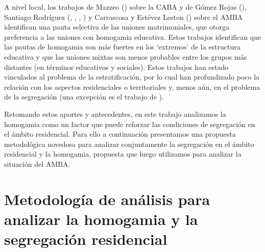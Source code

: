 \documentclass[
  spanish,
  a4paper,%
  chapterprefix=true,%
  DIV=calc,%
  twoside]{scrbook}%
\begin{document}
A nivel local, los trabajos de Mazzeo () sobre la CABA y de
Gómez Rojas (), Santiago Rodríguez (, , , ) y Carrascosa y Estévez Leston () sobre el AMBA
identifican una pauta selectiva de las uniones matrimoniales, que otorga
preferencia a las uniones con homogamia educativa. Estos trabajos
identifican que las pautas de homogamia son más fuertes en los
`extremos' de la estructura educativa y que las uniones mixtas son menos
probables entre los grupos más distantes (en términos educativos y
sociales). Estos trabajos han estado vinculados al problema de la
estratificación, por lo cual han profundizado poco la relación con los
aspectos residenciales o territoriales y, menos aún, en el problema de
la segregación (una excepción es el trabajo de ).

Retomando estos aportes y antecedentes, en este trabajo analizamos la
homogamia como un factor que puede reforzar las condiciones de
segregación en el ámbito residencial. Para ello a continuación
presentamos una propuesta metodológica novedosa para analizar
conjuntamente la segregación en el ámbito residencial y la homogamia,
propuesta que luego utilizamos para analizar la situación del AMBA.

\section{Metodología de análisis para analizar la homogamia y la segregación residencial}\label{homogamy-method}
\end{document}
